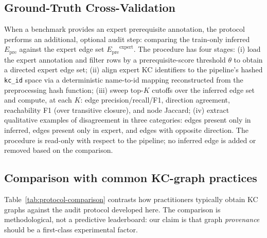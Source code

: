 \documentclass[pdflatex,sn-mathphys-num]{sn-jnl}
\newcommand{\Epre}{\ensuremath{E_{\text{pre}}}}
\begin{document}
\subsection{Ground-Truth Cross-Validation}
\label{sec:gtxv-protocol}
When a benchmark provides an expert prerequisite annotation, the
protocol performs an additional, optional audit step: comparing the
train-only inferred $\Epre$ against the expert edge set
$\Epre^{\text{expert}}$. The procedure has four stages:
(i) load the expert annotation and filter rows by a prerequisite-score
threshold $\theta$ to obtain a directed expert edge set;
(ii) align expert KC identifiers to the pipeline's hashed \texttt{kc\_id}
space via a deterministic name-to-id mapping reconstructed from the
preprocessing hash function;
(iii) sweep top-$K$ cutoffs over the inferred edge set and compute,
at each $K$: edge precision/recall/F1, direction agreement, reachability
F1 (over transitive closure), and node Jaccard;
(iv) extract qualitative examples of disagreement in three categories:
edges present only in inferred, edges present only in expert, and edges
with opposite direction.
The procedure is read-only with respect to the pipeline; no
inferred edge is added or removed based on the comparison.

\subsection{Comparison with common KC-graph practices}
\label{sec:protocol-comparison}
Table~\ref{tab:protocol-comparison} contrasts how practitioners typically
obtain KC graphs against the audit protocol developed here. The comparison
is methodological, not a predictive leaderboard: our claim is that graph
\emph{provenance} should be a first-class experimental factor.
\end{document}
